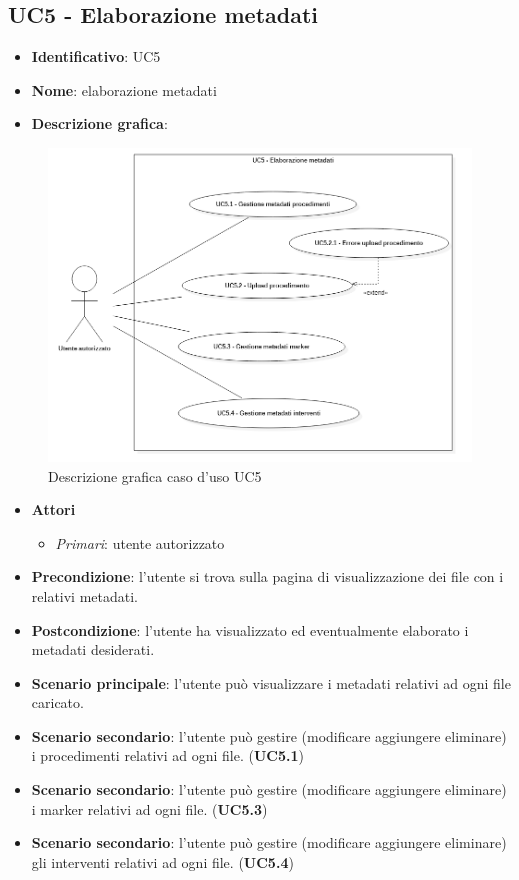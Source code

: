 \subsection{UC5 - Elaborazione metadati}
\begin{itemize}
  \item \textbf{Identificativo}: UC5
  \item \textbf{Nome}: elaborazione metadati
  \item \textbf{Descrizione grafica}:
\end{itemize}

\begin{figure}[H]
  \centering
  \includegraphics[width=\textwidth]{immagini/usecase/UC5.png}
  \caption{Descrizione grafica caso d'uso UC5}
\end{figure}

\begin{itemize}
  \item \textbf{Attori}
        \begin{itemize}
          \item \textit{Primari}: utente autorizzato
        \end{itemize}
  \item \textbf{Precondizione}: l'utente si trova sulla pagina di visualizzazione dei file con i relativi metadati.
  \item \textbf{Postcondizione}: l'utente ha visualizzato ed eventualmente elaborato i metadati desiderati.
  \item \textbf{Scenario principale}: l'utente può visualizzare i metadati relativi ad ogni file caricato.
  \item \textbf{Scenario secondario}: l'utente può gestire (modificare aggiungere eliminare) i procedimenti relativi ad ogni file. (\textbf{UC5.1})
  \item \textbf{Scenario secondario}: l'utente può gestire (modificare aggiungere eliminare) i marker relativi ad ogni file. (\textbf{UC5.3})
  \item \textbf{Scenario secondario}: l'utente può gestire (modificare aggiungere eliminare) gli interventi relativi ad ogni file. (\textbf{UC5.4})
\end{itemize}

